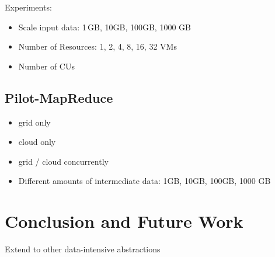 \documentclass[times]{cpeauth}
\begin{document}
Experiments:
\begin{itemize}
	\item Scale input data: 1\,GB, 10GB, 100GB, 1000 GB
	\item Number of Resources: 1, 2, 4, 8, 16, 32 VMs
	\item Number of CUs
\end{itemize}



\subsection{Pilot-MapReduce}
\begin{itemize}
	\item grid only
	\item cloud only
	\item grid / cloud concurrently
	\item  Different amounts of intermediate data: 1GB, 10GB, 100GB, 1000 GB	
\end{itemize}

\section{Conclusion and Future Work}

Extend to other data-intensive abstractions



\end{document}
